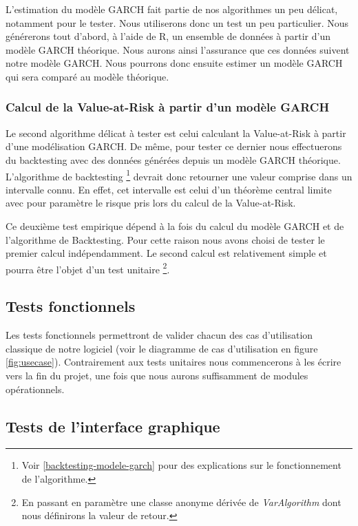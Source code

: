 \documentclass[a4paper,titlepage,french]{report}
\begin{document}
L'estimation du modèle GARCH fait partie de nos algorithmes un peu délicat, notamment pour le tester.
Nous utiliserons donc un test un peu particulier.
Nous générerons tout d'abord, à l'aide de R, un ensemble de données à partir d'un modèle GARCH théorique.
Nous aurons ainsi l'assurance que ces données suivent notre modèle GARCH.
Nous pourrons donc ensuite estimer un modèle GARCH qui sera comparé au modèle théorique.

\subsubsection{Calcul de la Value-at-Risk à partir d'un modèle GARCH}

Le second algorithme délicat à tester est celui calculant la Value-at-Risk à partir d'une modélisation GARCH.
De même, pour tester ce dernier nous effectuerons du backtesting avec des données générées depuis un modèle GARCH théorique.
L'algorithme de backtesting \footnote{Voir \ref{backtesting-modele-garch} pour des explications sur le fonctionnement de l'algorithme.} devrait donc retourner une valeur comprise dans un intervalle connu. 
En effet, cet intervalle est celui d'un théorème central limite avec pour paramètre le risque pris lors du calcul de la Value-at-Risk.

Ce deuxième test empirique dépend à la fois du calcul du modèle GARCH et de l'algorithme de Backtesting. Pour cette raison nous avons choisi de tester le premier calcul indépendamment. Le second calcul est relativement simple et pourra être l'objet d'un test unitaire \footnote{En passant en paramètre une classe anonyme dérivée de \textit{VarAlgorithm} dont nous définirons la valeur de retour.}.


\subsection{Tests fonctionnels}

Les tests fonctionnels permettront de valider chacun des cas d'utilisation classique de notre logiciel (voir le diagramme de cas d'utilisation en figure \ref{fig:usecase}).
Contrairement aux tests unitaires nous commencerons à les écrire vers la fin du projet, une fois que nous aurons suffisamment de modules opérationnels.

\subsection{Tests de l'interface graphique}
\end{document}
